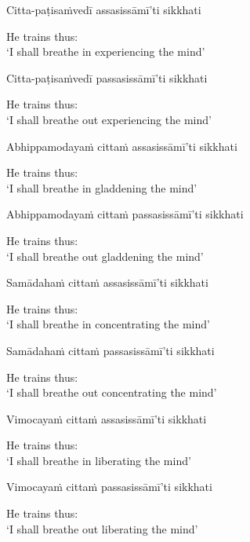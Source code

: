 Citta-paṭisaṁvedī assasissāmī'ti sikkhati

\begin{english}
  He trains thus:\\
  `I shall breathe in experiencing the mind'
\end{english}

Citta-paṭisaṁvedī passasissāmī'ti sikkhati

\begin{english}
  He trains thus:\\
  `I shall breathe out experiencing the mind'
\end{english}

Abhippamodayaṁ cittaṁ assasissāmī'ti sikkhati

\begin{english}
  He trains thus:\\
  `I shall breathe in gladdening the mind'
\end{english}

Abhippamodayaṁ cittaṁ passasissāmī'ti sikkhati

\begin{english}
  He trains thus:\\
  `I shall breathe out gladdening the mind'
\end{english}

Samādahaṁ cittaṁ assasissāmī'ti sikkhati

\begin{english}
  He trains thus:\\
  `I shall breathe in concentrating the mind'
\end{english}

Samādahaṁ cittaṁ passasissāmī'ti sikkhati

\begin{english}
  He trains thus:\\
  `I shall breathe out concentrating the mind'
\end{english}

Vimocayaṁ cittaṁ assasissāmī'ti sikkhati

\begin{english}
  He trains thus:\\
  `I shall breathe in liberating the mind'
\end{english}

Vimocayaṁ cittaṁ passasissāmī'ti sikkhati

\begin{english}
  He trains thus:\\
  `I shall breathe out liberating the mind'
\end{english}

